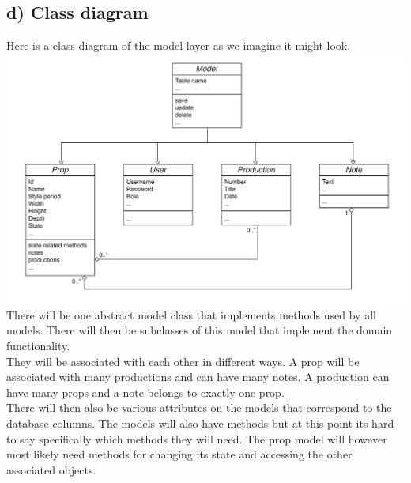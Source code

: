 \documentclass[12pt]{article}
\begin{document}
\subsection{d) Class diagram}
Here is a class diagram of the model layer as we imagine it might look.
\newline
\newline
\includegraphics[scale=0.2]{class-diagram.png}
\newline
There will be one abstract model class that implements methods used by all models. There will then be subclasses of this model that implement the domain functionality.\\
They will be associated with each other in different ways. A prop will be associated with many productions and can have many notes. A production can have many props and a note belongs to exactly one prop.\\
There will then also be various attributes on the models that correspond to the database columns. The models will also have methods but at this point its hard to say specifically which methods they will need. The prop model will however most likely need methods for changing its state and accessing the other associated objects.
\end{document}
